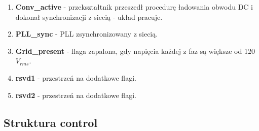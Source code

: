 \documentclass[12pt,a4paper]{article}
\begin{document}
\begin{enumerate}
	\item \textbf{Conv\_active} - przekształtnik przeszedł procedurę ładowania obwodu DC i dokonał synchronizacji z siecią - układ pracuje.
	
	\item \textbf{PLL\_sync} - PLL zsynchronizowany z siecią.
	
	\item \textbf{Grid\_present} - flaga zapalona, gdy napięcia każdej z faz są większe od 120$V_{rms}$.
	
	\item \textbf{rsvd1} - przestrzeń na dodatkowe flagi.
		
	\item \textbf{rsvd2} - przestrzeń na dodatkowe flagi.
\end{enumerate}

\subsection{Struktura control}


\end{document}
